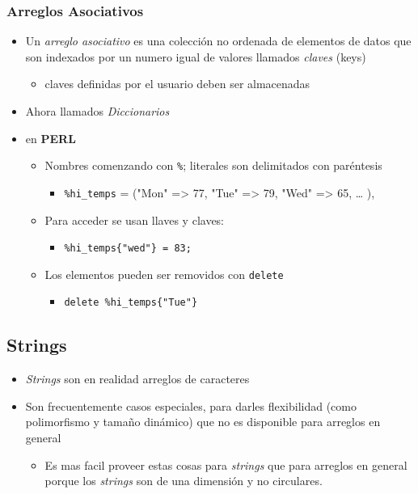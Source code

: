 \documentclass[11pt]{article}
\begin{document}
\subsubsection*{Arreglos Asociativos}
\label{sec:orgheadline29}
\begin{itemize}
\item Un \emph{arreglo asociativo} es una colección no ordenada de elementos de
datos que son indexados por un numero igual de valores llamados
\emph{claves} (keys)
\begin{itemize}
\item claves definidas por el usuario deben ser almacenadas
\end{itemize}
\item Ahora llamados \emph{Diccionarios}
\item en \textbf{PERL}
\begin{itemize}
\item Nombres comenzando con \texttt{\%}; literales son delimitados con
paréntesis
\begin{itemize}
\item \texttt{\%hi\_temps} = ("Mon" => 77, "Tue" => 79, "Wed" => 65, \ldots{} ),
\end{itemize}
\item Para acceder se usan llaves y claves:
\begin{itemize}
\item \texttt{\%hi\_temps\{"wed"\} = 83;}
\end{itemize}
\item Los elementos pueden ser removidos con \texttt{delete}
\begin{itemize}
\item \texttt{delete \%hi\_temps\{"Tue"\}}
\end{itemize}
\end{itemize}
\end{itemize}


\subsection*{Strings}
\label{sec:orgheadline31}
\begin{itemize}
\item \emph{Strings} son en realidad arreglos de caracteres
\item Son frecuentemente casos especiales, para darles flexibilidad (como
polimorfismo y tamaño dinámico) que no es disponible para arreglos
en general
\begin{itemize}
\item Es mas facil proveer estas cosas para \emph{strings} que para arreglos
en general porque los \emph{strings} son de una dimensión y no circulares.
\end{itemize}
\end{itemize}
\end{document}

